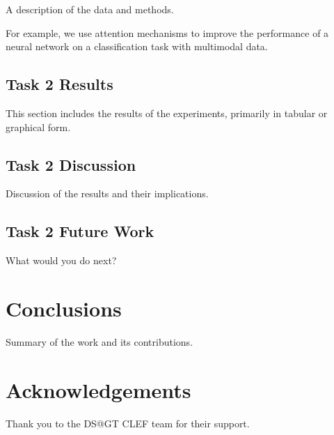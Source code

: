 \documentclass[]{style/ceurart}
\begin{document}
A description of the data and methods.

For example, we use attention mechanisms \cite{vaswani2017attention} to improve the performance of a neural network on a classification task with multimodal data.

\subsection{Task 2 Results}

This section includes the results of the experiments, primarily in tabular or graphical form.

\subsection{Task 2 Discussion}

Discussion of the results and their implications.

\subsection{Task 2 Future Work}

What would you do next?


\section{Conclusions}

Summary of the work and its contributions.

\section*{Acknowledgements}

Thank you to the DS@GT CLEF team for their support.



\end{document}
